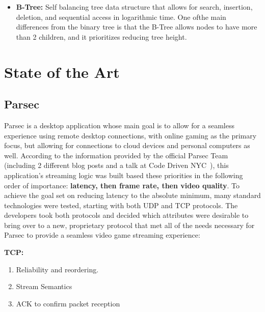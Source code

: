 \documentclass{article}
\begin{document}
\begin{itemize}
    whenever it is full and a thread wants to send data to it, the thread can either block itself until the channel can accept the data (blocking\_send) or it can drop the data and continue its process.  
    \item \textbf{B-Tree:} Self balancing tree data structure that allows for search, insertion, deletion, and sequential access in logarithmic time. One ofthe main differences from the binary tree is that the B-Tree allows nodes to have more than 2 children, and it prioritizes reducing tree height.
\end{itemize}

\section{State of the Art}
\label{sec:stateart}
    \subsection{Parsec} Parsec is a desktop application whose main goal is to allow for a seamless experience using remote desktop connections, with online gaming as the primary focus, but allowing for connections to cloud devices and personal computers as well.
        According to the information provided by the official Parsec Team (including 2 different blog posts and a talk at Code Driven NYC~\cite{parsec_streaming,parsec_udp_primer,parsec_udp_slides}), this application's streaming logic was built based these
        priorities in the following order of importance: \textbf{latency, then frame rate, then video quality}. To achieve the goal set on reducing latency to the absolute minimum, many standard technologies were
        tested, starting with both UDP and TCP protocols. The developers took both protocols and decided which attributes were desirable to bring over to a new, proprietary protocol that met all of the needs necessary for Parsec to provide a seamless video game streaming experience:
        
        \textbf{TCP:} 
            \begin{enumerate}
                \item Reliability and reordering.
                \item Stream Semantics
                \item ACK to confirm packet reception 
            \end{enumerate}
        
\end{document}
